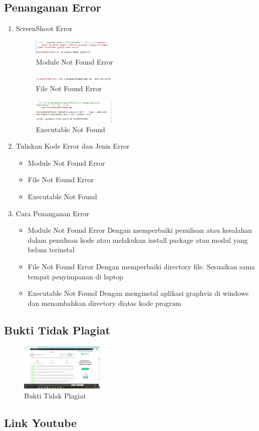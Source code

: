 \subsection{Penanganan Error}
\begin{enumerate}
\item ScreenShoot Error
	\begin{figure}[H]
		\includegraphics[width=4cm]{figures/1174073/2/error1.png}
		\centering
		\caption{Module Not Found Error}
	\end{figure}
	\begin{figure}[H]
		\includegraphics[width=4cm]{figures/1174073/2/error2.png}
		\centering
		\caption{File Not Found Error}
	\end{figure}
	\begin{figure}[H]
		\includegraphics[width=4cm]{figures/1174073/2/error3.png}
		\centering
		\caption{Executable Not Found}
	\end{figure}

	\item Tuliskan Kode Error dan Jenis Error
	\begin{itemize}
		\item Module Not Found Error
		\item File Not Found Error
		\item Executable Not Found
	\end{itemize}
	\item Cara Penanganan Error
	\begin{itemize}
		\item Module Not Found Error
		\hfill\break
		Dengan memperbaiki penulisan atau kesalahan dalam penulisan kode atau melakukan install package atau modul yang belum terinstal
		\item File Not Found Error
		\hfill\break
		Dengan memperbaiki directory file. Sesuaikan sama tempat penyimpanan di laptop
		\item Executable Not Found
		\hfill\break
		Dengan menginstal aplikasi graphviz di windows dan menambahkan directory diatas kode program
	\end{itemize}
\end{enumerate}

\subsection{Bukti Tidak Plagiat}
\begin{figure}[H]
	\includegraphics[width=4cm]{figures/1174073/2/plagiarisme.png}
	\centering
	\caption{Bukti Tidak Plagiat}
\end{figure}

\subsection{Link Youtube}
